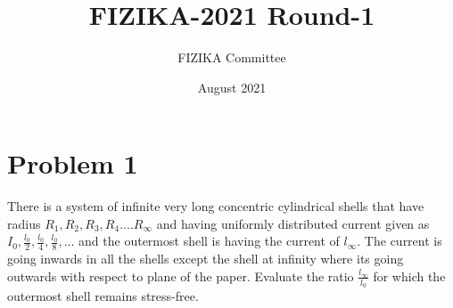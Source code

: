 \documentclass[11pt,a4paper,fleqn]{scrartcl}
\title{FIZIKA-2021 Round-1}
\author{FIZIKA Committee}
\date{August 2021}
\begin{document}
\maketitle
 
\vspace{8mm}
\section{Problem 1}
\begin{problem}
There is a system of infinite very long concentric cylindrical shells that have radius $R_1,R_2,R_3,R_4....R_{\infty}$ and having uniformly distributed current given as $I_0,\frac{l_0}{2},\frac{l_0}{4},\frac{l_0}{8},...$ and the outermost shell is having the current of $l_{\infty}$. The current is going inwards in all the shells except the shell at infinity where its going outwards with respect to plane of the paper. Evaluate the ratio $\frac{l_{\infty}}{l_0}$ for which the outermost shell remains stress-free.
\begin{center}
    

\begin{tikzpicture}[x=0.75pt,y=0.75pt,yscale=-1,xscale=1]


\end{tikzpicture}
\end{center}
\end{problem}
\end{document}
